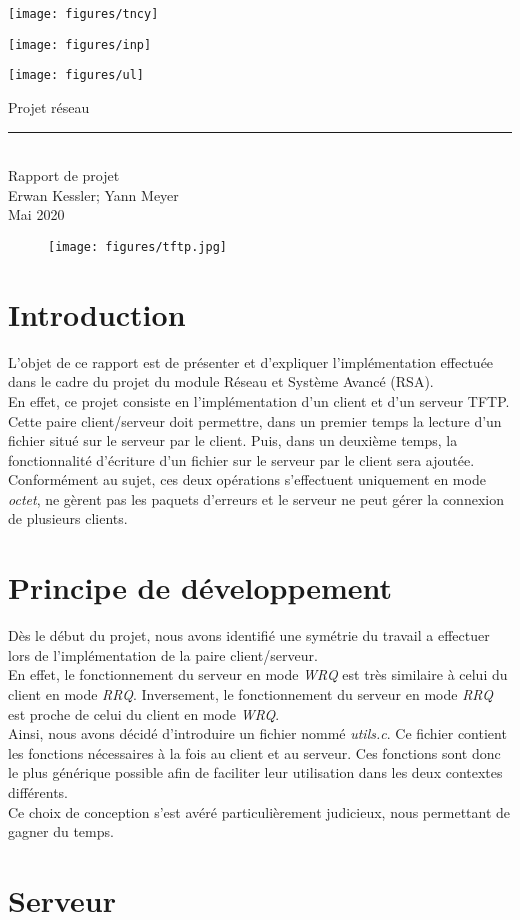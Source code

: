 \documentclass{article}
\def\titre{Projet réseau}
\def\soustitre{Rapport de projet}
\def\groupe{Erwan Kessler; Yann Meyer}
\def\date{6 Mai 2020}
\def\maketitle{
    \pagestyle{empty}
    
    \begin{minipage}[c]{0.3\linewidth}
        \texttt{[image: figures/tncy]}
    \end{minipage}
    \hfill
    \begin{minipage}[c]{0.3\linewidth}
        \texttt{[image: figures/inp]}
    \end{minipage}
    \hfill
    \begin{minipage}[c]{0.3\linewidth}
        \texttt{[image: figures/ul]}
    \end{minipage}
    
    \vfill
    
    \begin{center}
        {\fontsize{40}{40}\selectfont \titre}
        \\ \bigskip \bigskip
        \rule{\textwidth}{1pt}
        \\ \bigskip \bigskip
        {\fontsize{24}{24}\selectfont \soustitre}
        \\ \bigskip
        {\fontsize{12}{12}\selectfont \groupe}
        \\ \bigskip
        {\fontsize{14}{14}\selectfont \date}
        
    \end{center}
    
    \vfill
    \begin{figure}[ht]
        \centering
        \texttt{[image: figures/tftp.jpg]}
    \end{figure}
   
    \vfill
    
    \clearpage
    \pagestyle{plain}
    \setcounter{page}{1}
}
\begin{document}
\maketitle

\tableofcontents
\vfill\vfill

\newpage

\section{Introduction}

    L'objet de ce rapport est de présenter et d'expliquer l'implémentation effectuée dans le cadre du projet du module Réseau et Système Avancé (RSA).\\
    En effet, ce projet consiste en l'implémentation d'un client et d'un serveur TFTP.\\
    Cette paire client/serveur doit permettre, dans un premier temps la lecture d'un fichier situé sur le serveur par le client. Puis, dans un deuxième temps, la fonctionnalité d'écriture d'un fichier sur le serveur par le client sera ajoutée.\\
    Conformément au sujet, ces deux opérations s'effectuent uniquement en mode \emph{octet}, ne gèrent pas les paquets d'erreurs et le serveur ne peut gérer la connexion de plusieurs clients.
    
\section{Principe de développement}   
    
    Dès le début du projet, nous avons identifié une symétrie du travail a effectuer lors de l'implémentation de la paire client/serveur.\\
    En effet, le fonctionnement du serveur en mode \emph{WRQ} est très similaire à celui du client en mode \emph{RRQ}. Inversement, le fonctionnement du serveur en mode \emph{RRQ} est proche de celui du client en mode \emph{WRQ}.\\
    Ainsi, nous avons décidé d'introduire un fichier nommé \emph{utils.c}. Ce fichier contient les fonctions nécessaires à la fois au client et au serveur. Ces fonctions sont donc le plus générique possible afin de faciliter leur utilisation dans les deux contextes différents.\\
    Ce choix de conception s'est avéré particulièrement judicieux, nous permettant de gagner du temps. 
    
\section{Serveur}
\end{document}
